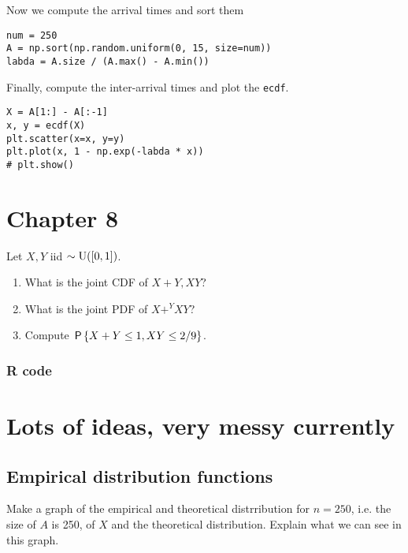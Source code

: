 \documentclass[a4paper]{article}
\begin{document}
Now we compute the arrival times and sort them

\begin{verbatim}
num = 250
A = np.sort(np.random.uniform(0, 15, size=num))
labda = A.size / (A.max() - A.min()) 
\end{verbatim}

Finally, compute the inter-arrival times and plot the \texttt{ecdf}.
\begin{verbatim}
X = A[1:] - A[:-1]
x, y = ecdf(X)
plt.scatter(x=x, y=y)
plt.plot(x, 1 - np.exp(-labda * x))
# plt.show()

\end{verbatim}

\section{Chapter 8}
\label{sec:chapter-8}

\begin{exercise}
Let $X, Y$ iid $\sim \Unif{[0,1]}$. 
\begin{enumerate}
\item What is the joint CDF of $X+Y, XY$?
\item What is the joint PDF of $X+^Y XY$?
\item Compute $\P{X+Y\leq 1, XY\leq 2/9}$.
\end{enumerate}
\end{exercise}


\subsubsection*{R code}
\label{sec:orgbbfd4db}



\section{Lots of  ideas, very messy currently}
\label{sec:lots-ideas-very}


\subsection{Empirical distribution functions}
\label{sec:org27b4ea4}
\begin{exercise}
Make a graph of the empirical and theoretical distrribution for $n=250$, i.e. the size of $A$ is 250, of $X$ and the theoretical distribution. Explain what we can see in this graph. 
\end{exercise}
\end{document}
